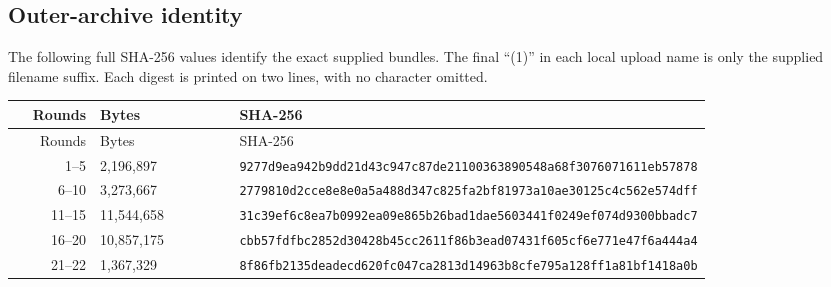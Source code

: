 \documentclass[11pt,a4paper]{article}
\theoremstyle{definition}\newtheorem{definition}[theorem]{Definition}
\theoremstyle{remark}\newtheorem{remark}[theorem]{Remark}
\begin{document}
\subsection{Outer-archive identity}
The following full SHA-256 values identify the exact supplied bundles.
The final ``(1)'' in each local upload name is only the supplied filename
suffix. Each digest is printed on two lines, with no character omitted.
\begin{longtable}{rp{0.20\linewidth}p{0.61\linewidth}}
\toprule
Rounds&Bytes&SHA-256\\\midrule
\endfirsthead
\toprule Rounds&Bytes&SHA-256\\\midrule
\endhead

1--5&2,196,897&\texttt{9277d9ea942b9dd21d43c947c87de211}\newline\texttt{00363890548a68f3076071611eb57878}\\[5pt]

6--10&3,273,667&\texttt{2779810d2cce8e8e0a5a488d347c825f}\newline\texttt{a2bf81973a10ae30125c4c562e574dff}\\[5pt]

11--15&11,544,658&\texttt{31c39ef6c8ea7b0992ea09e865b26bad}\newline\texttt{1dae5603441f0249ef074d9300bbadc7}\\[5pt]

16--20&10,857,175&\texttt{cbb57fdfbc2852d30428b45cc2611f86}\newline\texttt{b3ead07431f605cf6e771e47f6a444a4}\\[5pt]

21--22&1,367,329&\texttt{8f86fb2135deadecd620fc047ca2813d}\newline\texttt{14963b8cfe795a128ff1a81bf1418a0b}\\[5pt]

\bottomrule
\end{longtable}
\end{document}
